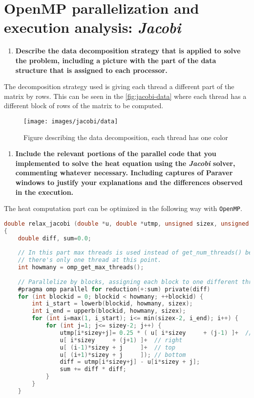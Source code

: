 \documentclass[a4paper]{article}
\newenvironment{questionenum}{%
\setlist[enumerate]{resume}
\restartlist{enumerate}
\newcommand{\question}[1]{
\begin{enumerate}
	\item\bfseries ##1
\end{enumerate}
}}{%
}
\begin{document}
\section{OpenMP parallelization and execution analysis: \emph{Jacobi}}
\begin{questionenum}
	\question{Describe the data decomposition strategy that is applied to solve the problem, including a picture with the part of the data structure that is assigned to each processor.}
	
	The decomposition strategy used is giving each thread a different part of the matrix by rows. This can be seen in the \autoref{fig:jacobi-data} where each thread has a different block of rows of the matrix to be computed. 
	
	\begin{figure}[H]
		\centering
		\texttt{[image: images/jacobi/data]}
		\caption{Figure describing the data decomposition, each thread has one color}
		\label{fig:jacobi-data}
	\end{figure}
	
	\question{Include the relevant portions of the parallel code that you implemented to solve the heat equation using the \emph{Jacobi} solver, commenting whatever necessary. Including captures of Paraver windows to justify your explanations and the differences observed in the execution.}
	
	The heat computation part can be optimized in the following way with \texttt{OpenMP}. 
	\begin{center}
		
	\begin{minipage}{0.9\textwidth}
		\begin{lstlisting}[language=C, title=\texttt{solver-tareador.c}]
double relax_jacobi (double *u, double *utmp, unsigned sizex, unsigned sizey)
{
	double diff, sum=0.0;
	
	// In this part max threads is used instead of get_num_threads() beacuse 
	// there's only one thread at this point.
	int howmany = omp_get_max_threads();
		
	// Parallelize by blocks, assigning each block to one different thread
	#pragma omp parallel for reduction(+:sum) private(diff)
	for (int blockid = 0; blockid < howmany; ++blockid) {
		int i_start = lowerb(blockid, howmany, sizex);
		int i_end = upperb(blockid, howmany, sizex);
		for (int i=max(1, i_start); i<= min(sizex-2, i_end); i++) {
			for (int j=1; j<= sizey-2; j++) {
				utmp[i*sizey+j]= 0.25 * ( u[ i*sizey     + (j-1) ]+  // left
				u[ i*sizey     + (j+1) ]+  // right
				u[ (i-1)*sizey + j     ]+  // top
				u[ (i+1)*sizey + j     ]); // bottom
				diff = utmp[i*sizey+j] - u[i*sizey + j];
				sum += diff * diff;
			}
		}
	}
	

\end{lstlisting}
\end{minipage}
\end{center}
\end{questionenum}
\end{document}
